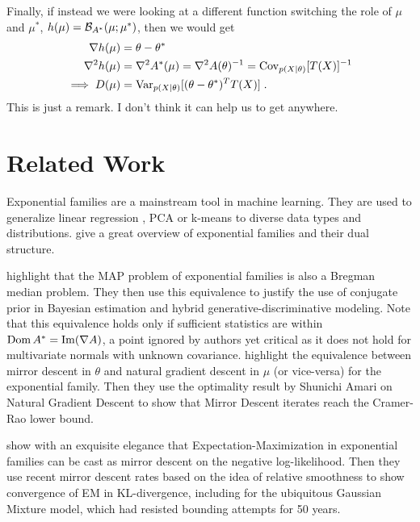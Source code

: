 \documentclass{article}
\newcommand{\logpart}{A}
\newcommand{\conj}{\logpart^*}
\newcommand{\bregmanconj}{\cB_{\logpart^*}}
\newcommand{\natp}{\theta}
\newcommand{\meanp}{\mu}
\newcommand{\decrement}{D}
\begin{document}
Finally, if instead we were looking at a different function switching the role of $\meanp$ and $\meanp^*$,  $h(\meanp) = \bregmanconj ( \meanp ; \meanp^*)$, then we would get
\begin{align}
    \nabla h(\meanp ) 
    &= \natp - \natp^* \\
    \nabla^2 h(\meanp ) 
    &= \nabla^2 \conj(\meanp) 
    = \nabla^2 \logpart(\natp) ^{-1}
    = \Cov_{p(X|\natp)}[T(X)]^{-1}\\
    \implies 
    \decrement(\meanp)
    &= \Var_{p(X|\natp)}[(\natp - \natp^*)^T T(X)] \; .
\end{align}
This is just a remark. I don't think it can help us to get anywhere. 

\section{Related Work}
Exponential families are a mainstream tool in machine learning. They are used  to generalize linear regression \citep{mccullagh1989generalized}, PCA \citep{collins2001generalization} or k-means \citep{banerjee2005clustering} to diverse data types and distributions.
\citet[Chapter 3]{wainwright2008graphical} give a great overview of exponential families and their dual structure. 

\citet{agarwal2010geometric} highlight that the MAP problem of exponential families is also a Bregman median problem. They then use this equivalence to justify the use of conjugate prior in Bayesian estimation and hybrid generative-discriminative modeling.
Note that this equivalence holds only if sufficient statistics are within $\dom \conj  = \mathrm{Im} (\nabla\logpart)$, a point ignored by authors yet critical as it does not hold for multivariate normals with unknown covariance. 
\citet{raskutti2015information} highlight the equivalence between mirror descent in $\natp$ and natural gradient descent in $\meanp$ (or vice-versa) for the exponential family. Then they use the optimality result by Shunichi Amari on Natural Gradient Descent to show that Mirror Descent iterates reach the Cramer-Rao lower bound.

\citet{kunstner2020homeomorphic} show with an exquisite elegance that Expectation-Maximization in exponential families can be cast as mirror descent on the negative log-likelihood. Then they use recent mirror descent rates based on the idea of relative smoothness \citep{birnbaum2011distributed, bauschke2017descent, lu2018relatively} to show convergence of EM in KL-divergence, including for the ubiquitous Gaussian Mixture model, which had resisted bounding attempts for 50 years.
\end{document}
